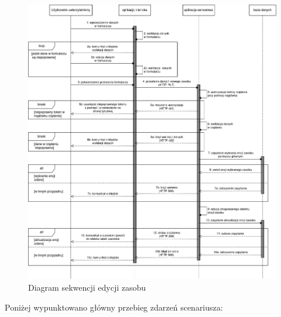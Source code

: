 \begin{figure}[!htbp] 
    \centering
    \includegraphics[width=\textwidth]{img/chapter4/open-osp.uml-diagrams-sequence.update-resource.png}
    \caption{Diagram sekwencji edycji zasobu}
    \label{fig:uml.sequence.update-resource}
\end{figure}

Poniżej wypunktowano główny przebieg zdarzeń scenariusza:


